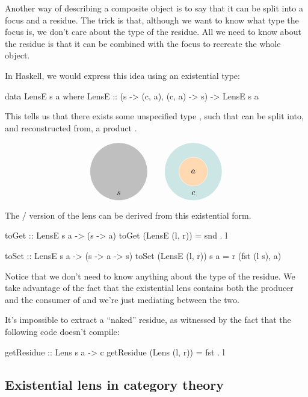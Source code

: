 \documentclass[DaoFP]{subfiles}
\begin{document}
Another way of describing a composite object is to say that it can be split into a focus and a residue. The trick is that, although we want to know what type the focus is, we don't care about the type of the residue. All we need to know about the residue is that it can be combined with the focus to recreate the whole object. 

In Haskell, we would express this idea using an existential type:
\begin{haskell}
data LensE s a where
    LensE :: (s -> (c, a), (c, a) -> s) -> LensE s a
\end{haskell}
This tells us that there exists some unspecified type , such that  can be split into, and reconstructed from, a product . 

\[
\begin{tikzpicture}
\filldraw[fill=gray!50, draw=white] (0, 0) circle (1.2);
\node at (0, -0.9) {$s$};
\end{tikzpicture}
\hspace{20pt}
\begin{tikzpicture}
\filldraw[fill=blue!50!green!20, draw=white] (0, 0) circle (1.2);
\filldraw[fill=orange!30, draw=white] (0, 0) circle (0.6);
\node at (0, 0) {$a$};
\node at (0, -0.9) {$c$};
\end{tikzpicture}
\]


The / version of the lens can be derived from this existential form.
\begin{haskell}
toGet :: LensE s a -> (s -> a)
toGet (LensE (l, r)) = snd . l

toSet :: LensE s a -> (s -> a -> s)
toSet (LensE (l, r)) s a = r (fst (l s), a)
\end{haskell}

Notice that we don't need to know anything about the type of the residue. We take advantage of the fact that the existential lens contains both the producer and the consumer of  and we're just mediating between the two.

It's impossible to extract a ``naked'' residue, as witnessed by the fact that the following code doesn't compile:
\begin{haskell}
getResidue :: Lens s a -> c
getResidue (Lens (l, r)) = fst . l
\end{haskell}

\subsection{Existential lens in category theory}
\end{document}
